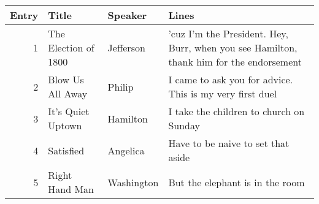 
\begin{tabular}{r|l|l|>{\raggedright\arraybackslash}p{6cm}}
\hline
\textbf{Entry} & \textbf{Title} & \textbf{Speaker} & \textbf{Lines}\\
\hline
1 & The Election of 1800 & Jefferson & 'cuz I'm the President. Hey, Burr, when
you see Hamilton, thank him for the endorsement\\
\hline
2 & Blow Us All Away & Philip & I came to ask you for advice. This is my very first duel\\
\hline
3 & It's Quiet Uptown & Hamilton & I take the children to church on Sunday\\
\hline
4 & Satisfied & Angelica & Have to be naive to set that aside\\
\hline
5 & Right Hand Man & Washington & But the elephant is in the room\\
\hline
\end{tabular}
